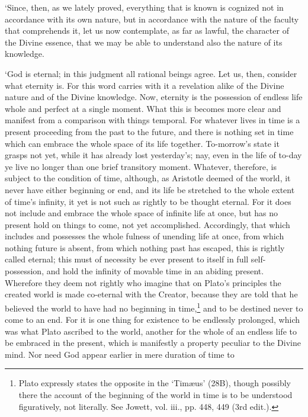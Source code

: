 \documentclass[11pt]{book}
\begin{document}
`Since, then, as we lately proved, everything that is \linebreak known is cognized
not in accordance with its own nature, but in accordance with the nature
of the faculty that comprehends it, let us now contemplate, as far as
lawful, the character of the Divine essence, that we may be able to
understand also the nature of its knowledge.

`God is eternal; in this judgment all rational beings agree. Let us,
then, consider what eternity is. For this word carries with it a
revelation alike of the Divine nature and of the Divine knowledge. Now,
eternity is the possession of endless life whole and perfect at a single
moment. What this is becomes more clear and manifest from a comparison
with things temporal. For whatever lives in time is a present proceeding
from the past to the future, and there is nothing set in time which can
embrace the whole space of its life together. To-morrow's state it
grasps not yet, while it has already lost yesterday's; nay, even in the
life of to-day ye live no longer than one brief transitory moment.
Whatever, therefore, is subject to the condition of time, although, as
Aristotle deemed of the world, it never have either beginning or end,
and its life be stretched to the whole extent of time's infinity, it yet
is not such as rightly to be thought eternal. For it does not include
and embrace the whole space of infinite life at once, but has no present
hold on things to come, not yet accomplished. Accordingly, that which
includes and possesses the whole fulness of unending life at once, from
which nothing future is absent, from which nothing past has escaped,
this is rightly called eternal; this must of necessity be ever present
to itself in full self-possession, and hold the infinity of movable time
in an abiding present. Wherefore they deem not rightly who imagine that
on Plato's principles the created world is made co-eternal with the
Creator, because they are told that he believed the world to have had
no beginning in time,\footnote{Plato expressly states the opposite in the `Timæus' (28B), though
possibly there the account of the beginning of the world in time is to
be understood figuratively, not literally. See Jowett, vol. iii., pp.
448, 449 (3rd edit.).} and to be destined never to come to an end. For
it is one thing for existence to be endlessly prolonged, which was what
Plato ascribed to the world, another for the whole of an endless life to
be embraced in the present, which is manifestly a property peculiar to
the Divine mind. Nor need God appear earlier in mere duration of time to
\end{document}
